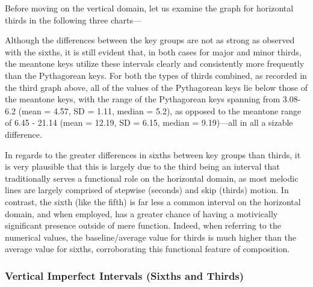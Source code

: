 Before moving on the vertical domain, let us examine the graph for
horizontal thirds in the following three charts---


    \begin{center}
    \end{center}
    


    \begin{center}
    \end{center}
    
    Although the differences between the key groups are not as strong as
observed with the sixths, it is still evident that, in both cases for
major and minor thirds, the meantone keys utilize these intervals
clearly and consistently more frequently than the Pythagorean keys. For
both the types of thirds combined, as recorded in the third graph above,
all of the values of the Pythagorean keys lie below those of the
meantone keys, with the range of the Pythagorean keys spanning from
3.08-6.2 (mean = 4.57, SD = 1.11, median = 5.2), as opposed to the
meantone range of 6.45 - 21.14 (mean = 12.19, SD = 6.15, median =
9.19)---all in all a sizable difference.

In regards to the greater differences in sixths between key groups than
thirds, it is very plausible that this is largely due to the third being
an interval that traditionally serves a functional role on the
horizontal domain, as most melodic lines are largely comprised of
stepwise (seconds) and skip (thirds) motion. In contrast, the sixth
(like the fifth) is far less a common interval on the horizontal domain,
and when employed, has a greater chance of having a motivically
significant presence outside of mere function. Indeed, when referring to
the numerical values, the baseline/average value for thirds is much
higher than the average value for sixths, corroborating this functional
feature of composition.

\subsubsection{Vertical Imperfect Intervals (Sixths and
Thirds)}\label{vertical-imperfect-intervals-sixths-and-thirds}


